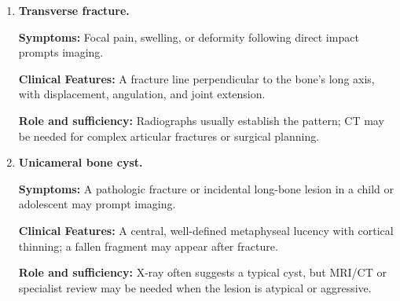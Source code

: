 \begin{enumerate}[leftmargin=*,itemsep=0.45em,topsep=0.4em]
\item \textbf{Transverse fracture.}\par\noindent\textbf{Symptoms:} Focal pain, swelling, or deformity following direct impact prompts imaging.\par\noindent\textbf{Clinical Features:} A fracture line perpendicular to the bone's long axis, with displacement, angulation, and joint extension.\par\noindent\textbf{Role and sufficiency:} Radiographs usually establish the pattern; CT may be needed for complex articular fractures or surgical planning.
\item \textbf{Unicameral bone cyst.}\par\noindent\textbf{Symptoms:} A pathologic fracture or incidental long-bone lesion in a child or adolescent may prompt imaging.\par\noindent\textbf{Clinical Features:} A central, well-defined metaphyseal lucency with cortical thinning; a fallen fragment may appear after fracture.\par\noindent\textbf{Role and sufficiency:} X-ray often suggests a typical cyst, but MRI/CT or specialist review may be needed when the lesion is atypical or aggressive.
\end{enumerate}

